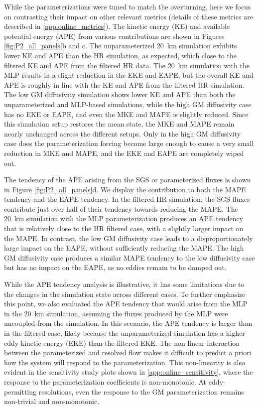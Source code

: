 \documentclass[draft]{agujournal2019}
\begin{document}
%
While the parameterizations were tuned to match the overturning, here we focus on contrasting their impact on other relevant metrics (details of these metrics are described in \ref{app:online_metrics}). The kinetic energy (KE) and available potential energy (APE) from various contributions are shown in Figures \ref{fig:P2_all_panels}b and c. The unparameterized 20~km simulation exhibits lower KE and APE than the HR simulation, as expected, which close to the filtered KE and APE from the filtered HR data. The 20~km simulation with the MLP results in a slight reduction in the EKE and EAPE, but the overall KE and APE is roughly in line with the KE and APE from the filtered HR simulation. The low GM diffusivity simulation shows lower KE and APE than both the unparameterized and MLP-based simulations, while the high GM diffusivity case has no EKE or EAPE, and even the MKE and MAPE is slightly reduced. 
Since this simulation setup restores the mean state, the MKE and MAPE remain nearly unchanged across the different setups. Only in the high GM diffusivity case does the parameterization forcing become large enough to cause a very small reduction in MKE and MAPE, and the EKE and EAPE are completely wiped out.


The tendency of the APE arising from the SGS or parameterized fluxes is shown in Figure \ref{fig:P2_all_panels}d. We display the contribution to both the MAPE tendency and the EAPE tendency. In the filtered HR simulation, the SGS fluxes contribute just over half of their tendency towards reducing the MAPE.
The 20~km simulation with the MLP parameterization produces an APE tendency that is relatively close to the HR filtered case, with a slightly larger impact on the MAPE. 
In contrast, the low GM diffusivity case leads to a disproportionately large impact on the EAPE, without sufficiently reducing the MAPE. The high GM diffusivity case produces a similar MAPE tendency to the low diffusivity case but has no impact on the EAPE, as no eddies remain to be damped out. 


While the APE tendency analysis is illustrative, it has some limitations due to the changes in the simulation state across different cases. To further emphasize this point, we also evaluated the APE tendency that would arise from the MLP in the 20~km simulation, assuming the fluxes produced by the MLP were uncoupled from the simulation. In this scenario, the APE tendency is larger than in the filtered case, likely because the unparameterized simulation has a higher eddy kinetic energy (EKE) than the filtered EKE.
The non-linear interaction between the parameterized and resolved flow makes it difficult to predict a priori how the system will respond to the parameterization. This non-linearity is also evident in the sensitivity study plots shown in \ref{app:online_sensitivity}, where the response to the parameterization coefficients is non-monotonic. At eddy-permitting resolutions, even the response to the GM parameterization remains non-trivial and non-monotonic.
\end{document}
